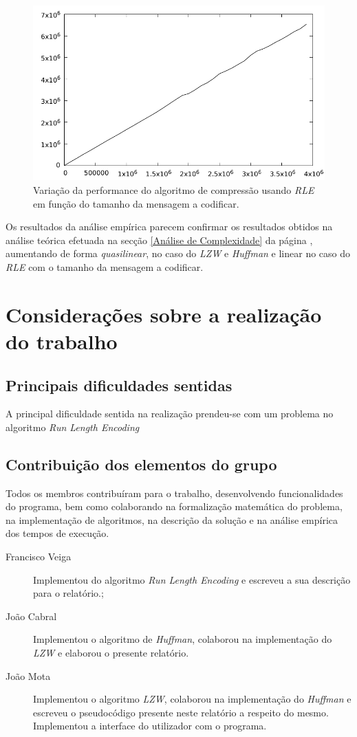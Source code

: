 \documentclass[a4paper,12pt,titlepage]{article}
\begin{document}
\begin{figure}
\includegraphics{rle.pdf}
\caption{Variação da performance do algoritmo de compressão usando \emph{RLE} em função do tamanho da mensagem a codificar.}
\label{f:3}
\end{figure}
Os resultados da análise empírica parecem confirmar os resultados obtidos na análise teórica efetuada na secção \ref{Análise de Complexidade} da página \pageref{Análise de Complexidade}, aumentando de forma \emph{quasilinear}, no caso do \emph{LZW} e \emph{Huffman} e linear no caso do \emph{RLE} com o tamanho da mensagem a codificar.

\section{Considerações sobre a realização do trabalho}
\subsection{Principais dificuldades sentidas}
A principal dificuldade sentida na realização prendeu-se com um problema no algoritmo \emph{Run Length Encoding}
\subsection{Contribuição dos elementos do grupo}
Todos os membros contribuíram para o trabalho, desenvolvendo funcionalidades do programa, bem como colaborando na formalização matemática do problema, na implementação de algoritmos, na descrição da solução e na análise empírica dos tempos de execução.
\begin{description}
\item[Francisco Veiga] Implementou do algoritmo \emph{Run Length Encoding} e escreveu a sua descrição para o relatório.;
\item[João Cabral] Implementou o algoritmo de \emph{Huffman}, colaborou na implementação do \emph{LZW} e elaborou o presente relatório.
\item[João Mota] Implementou o algoritmo \emph{LZW}, colaborou na implementação do \emph{Huffman} e escreveu o pseudocódigo presente neste relatório a respeito do mesmo. Implementou a interface do utilizador com o programa.

\end{description}
\end{document}
